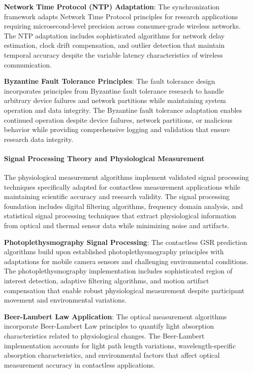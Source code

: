\documentclass[12pt,a4paper]{report}
\begin{document}
\textbf{Network Time Protocol (NTP) Adaptation}: The synchronization framework adapts Network Time Protocol principles for
research applications requiring microsecond-level precision across consumer-grade wireless networks. The NTP adaptation
includes sophisticated algorithms for network delay estimation, clock drift compensation, and outlier detection that
maintain temporal accuracy despite the variable latency characteristics of wireless communication.

\textbf{Byzantine Fault Tolerance Principles}: The fault tolerance design incorporates principles from Byzantine fault
tolerance research to handle arbitrary device failures and network partitions while maintaining system operation and
data integrity. The Byzantine fault tolerance adaptation enables continued operation despite device failures, network
partitions, or malicious behavior while providing comprehensive logging and validation that ensure research data
integrity.

\paragraph{Signal Processing Theory and Physiological Measurement}

The physiological measurement algorithms implement validated signal processing techniques specifically adapted for
contactless measurement applications while maintaining scientific accuracy and research validity. The signal processing
foundation includes digital filtering algorithms, frequency domain analysis, and statistical signal processing
techniques that extract physiological information from optical and thermal sensor data while minimizing noise and
artifacts.

\textbf{Photoplethysmography Signal Processing}: The contactless GSR prediction algorithms build upon established
photoplethysmography principles with adaptations for mobile camera sensors and challenging environmental conditions. The
photoplethysmography implementation includes sophisticated region of interest detection, adaptive filtering algorithms,
and motion artifact compensation that enable robust physiological measurement despite participant movement and
environmental variations.

\textbf{Beer-Lambert Law Application}: The optical measurement algorithms incorporate Beer-Lambert Law principles to quantify
light absorption characteristics related to physiological changes. The Beer-Lambert implementation accounts for light
path length variations, wavelength-specific absorption characteristics, and environmental factors that affect optical
measurement accuracy in contactless applications.
\end{document}
